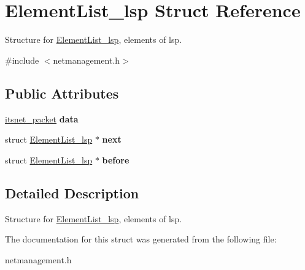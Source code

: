 \hypertarget{structElementList__lsp}{\section{\-Element\-List\-\_\-lsp \-Struct \-Reference}
\label{structElementList__lsp}
}


\-Structure for \hyperlink{structElementList__lsp}{\-Element\-List\-\_\-lsp}, elements of lsp.  




{\ttfamily \#include $<$netmanagement.\-h$>$}

\subsection*{\-Public \-Attributes}
\begin{DoxyCompactItemize}
\item 
\hypertarget{structElementList__lsp_a116f73fa401b83895c5ea82c65cfa67a}{\hyperlink{structitsnet__packet}{itsnet\-\_\-packet} {\bfseries data}}\label{structElementList__lsp_a116f73fa401b83895c5ea82c65cfa67a}

\item 
\hypertarget{structElementList__lsp_ae9474b6c6cf26e4d0a2e558fa2d678fb}{struct \hyperlink{structElementList__lsp}{\-Element\-List\-\_\-lsp} $\ast$ {\bfseries next}}\label{structElementList__lsp_ae9474b6c6cf26e4d0a2e558fa2d678fb}

\item 
\hypertarget{structElementList__lsp_a585205d00d0cb5fa649e10402c28214f}{struct \hyperlink{structElementList__lsp}{\-Element\-List\-\_\-lsp} $\ast$ {\bfseries before}}\label{structElementList__lsp_a585205d00d0cb5fa649e10402c28214f}

\end{DoxyCompactItemize}


\subsection{\-Detailed \-Description}
\-Structure for \hyperlink{structElementList__lsp}{\-Element\-List\-\_\-lsp}, elements of lsp. 

\-The documentation for this struct was generated from the following file\-:\begin{DoxyCompactItemize}
\item 
netmanagement.\-h\end{DoxyCompactItemize}
